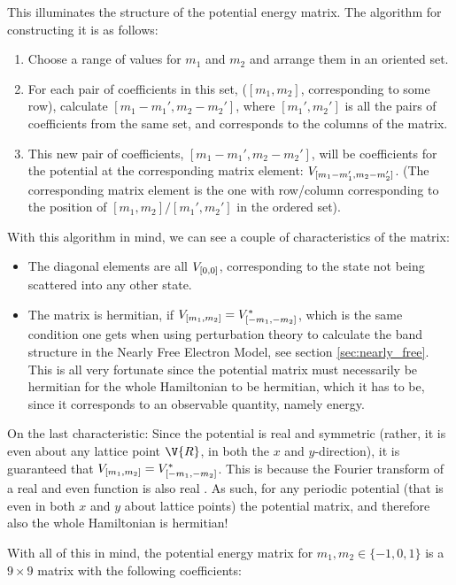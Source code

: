 \documentclass[main.tex]{subfiles}
\begin{document}
	This illuminates the structure of the potential energy matrix. The algorithm for constructing it is as follows:
	
	\begin{enumerate}
		\item Choose a range of values for $ m_1 $ and $ m_2 $ and arrange them in an oriented set.
		\item For each pair of coefficients in this set, ($ [m_1, m_2] $, corresponding to some row), calculate $ [m_1-m_1', m_2-m_2'] $, where $ [m_1', m_2'] $ is all the pairs of coefficients from the same set, and corresponds to the columns of the matrix.
		\item This new pair of coefficients, $ [m_1-m_1', m_2-m_2'] $, will be coefficients for the potential at the corresponding matrix element: $ V_{[m_1-m_1', m_2-m_2']} $. (The corresponding matrix element is the one with row/column corresponding to the position of $ [m_1, m_2]/[m_1', m_2'] $ in the ordered set). 
	\end{enumerate}
	With this algorithm in mind, we can see a couple of characteristics of the matrix:
	\begin{itemize}
		\item The diagonal elements are all $ V_{[0,0]} $, corresponding to the state not being scattered into any other state.
		\item The matrix is hermitian, if $ V_{[m_1, m_2]} = V^*_{[-m_1, -m_2]}$, which is the same condition one gets when using perturbation theory to calculate the band structure in the Nearly Free Electron Model, see section \ref{sec:nearly_free}. This is all very fortunate since the potential matrix must necessarily be hermitian for the whole Hamiltonian to be hermitian, which it has to be, since it corresponds to an observable quantity, namely energy.
	\end{itemize}
	On the last characteristic: Since the potential is real and symmetric (rather, it is even about any lattice point $ \V{R} $, in both the $ x $ and $ y $-direction), it is guaranteed that $ V_{[m_1, m_2]} = V^*_{[-m_1, -m_2]}$. This is because the Fourier transform of a real and even function is also real \cite{riley}. As such, for any periodic potential (that is even in both $ x $ and $ y $ about lattice points) the potential matrix, and therefore also the whole Hamiltonian is hermitian!
	
	With all of this in mind, the potential energy matrix for $ m_1, m_2 \in \{-1, 0, 1\} $ is a $ 9 \times 9 $ matrix with the following coefficients:
	
\end{document}
